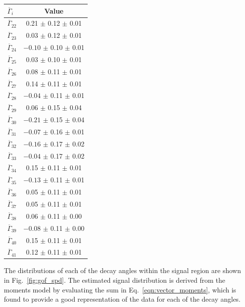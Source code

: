 \begin{table}[!tb]
\hspace{1em}
\begin{tabular}{l|c}
$\overline{\Gamma}_{i}$ & Value \\ 
\hline
$\overline{\Gamma}_{22}$ & \hphantom{$-$}0.21 $\pm$ 0.12 $\pm$ 0.01 \\ 
$\overline{\Gamma}_{23}$ & \hphantom{$-$}0.03 $\pm$ 0.12 $\pm$ 0.01 \\ 
$\overline{\Gamma}_{24}$ & $-0.10$ $\pm$ 0.10 $\pm$ 0.01 \\ 
$\overline{\Gamma}_{25}$ & \hphantom{$-$}0.03 $\pm$ 0.10 $\pm$ 0.01 \\ 
$\overline{\Gamma}_{26}$ & \hphantom{$-$}0.08 $\pm$ 0.11 $\pm$ 0.01 \\ 
$\overline{\Gamma}_{27}$ & \hphantom{$-$}0.14 $\pm$ 0.11 $\pm$ 0.01 \\ 
$\overline{\Gamma}_{28}$ & $-0.04$ $\pm$ 0.11 $\pm$ 0.01 \\ 
$\overline{\Gamma}_{29}$ & \hphantom{$-$}0.06 $\pm$ 0.15 $\pm$ 0.04 \\ 
$\overline{\Gamma}_{30}$ & $-0.21$ $\pm$ 0.15 $\pm$ 0.04 \\ 
$\overline{\Gamma}_{31}$ & $-0.07$ $\pm$ 0.16 $\pm$ 0.01 \\ 
$\overline{\Gamma}_{32}$ & $-0.16$ $\pm$ 0.17 $\pm$ 0.02 \\ 
$\overline{\Gamma}_{33}$ & $-0.04$ $\pm$ 0.17 $\pm$ 0.02 \\ 
$\overline{\Gamma}_{34}$ & \hphantom{$-$}0.15 $\pm$ 0.11 $\pm$ 0.01 \\ 
$\overline{\Gamma}_{35}$ & $-0.13$ $\pm$ 0.11 $\pm$ 0.01 \\ 
$\overline{\Gamma}_{36}$ & \hphantom{$-$}0.05 $\pm$ 0.11 $\pm$ 0.01 \\ 
$\overline{\Gamma}_{37}$ & \hphantom{$-$}0.05 $\pm$ 0.11 $\pm$ 0.01 \\ 
$\overline{\Gamma}_{38}$ & \hphantom{$-$}0.06 $\pm$ 0.11 $\pm$ 0.00 \\ 
$\overline{\Gamma}_{39}$ & $-0.08$ $\pm$ 0.11 $\pm$ 0.00 \\ 
$\overline{\Gamma}_{40}$ & \hphantom{$-$}0.15 $\pm$ 0.11 $\pm$ 0.01 \\ 
$\overline{\Gamma}_{41}$ & \hphantom{$-$}0.12 $\pm$ 0.11 $\pm$ 0.01 \\ 
\end{tabular}
\end{table}

The distributions of each of the decay angles within the signal region are shown in Fig.~\ref{fig:gof_spd}. The estimated signal distribution is derived 
from the moments model by evaluating the sum in Eq.~\ref{eqn:vector_moments}, which is found to provide a good representation of the data for each of the decay angles.


